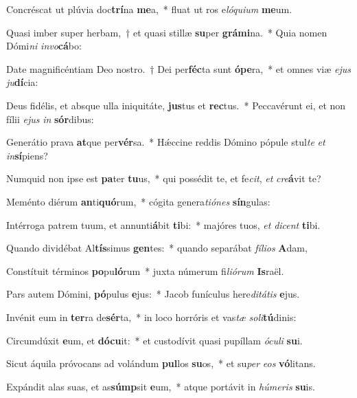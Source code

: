 \item Concréscat ut plúvia doc\textbf{trí}na \textbf{me}a,~* fluat ut ros e\textit{ló}\textit{qui}\textit{um} \textbf{me}um.
\item Quasi imber super herbam,~† et quasi stillæ \textbf{su}per \textbf{grá}\textbf{mi}na.~* Quia nomen Dómi\textit{ni} \textit{in}\textit{vo}\textbf{cá}bo:
\item Date magnificéntiam Deo nostro.~† Dei per\textbf{féc}ta sunt \textbf{ó}\textbf{pe}ra,~* et omnes viæ \textit{e}\textit{jus} \textit{ju}\textbf{dí}cia:
\item Deus fidélis, et absque ulla iniquitáte, \textbf{jus}tus et \textbf{rec}tus.~* Peccavérunt ei, et non fílii \textit{e}\textit{jus} \textit{in} \textbf{sór}dibus:
\item Generátio prava \textbf{at}que per\textbf{vér}sa.~* Hǽccine reddis Dómino pópule stul\textit{te} \textit{et} \textit{in}\textbf{sí}piens?
\item Numquid non ipse est \textbf{pa}ter \textbf{tu}us,~* qui possédit te, et fe\textit{cit}, \textit{et} \textit{cre}\textbf{á}vit te?
\item Meménto diérum \textbf{an}ti\textbf{quó}rum,~* cógita genera\textit{ti}\textit{ó}\textit{nes} \textbf{sín}gulas:
\item Intérroga patrem tuum, et annunti\textbf{á}bit \textbf{ti}bi:~* majóres tuos, \textit{et} \textit{di}\textit{cent} \textbf{ti}bi.
\item Quando dividébat Al\textbf{tís}simus \textbf{gen}tes:~* quando separábat \textit{fí}\textit{li}\textit{os} \textbf{A}dam,
\item Constítuit términos \textbf{po}pu\textbf{ló}rum~* juxta númerum fi\textit{li}\textit{ó}\textit{rum} \textbf{Is}raël.
\item Pars autem Dómini, \textbf{pó}pulus \textbf{e}jus:~* Jacob funículus here\textit{di}\textit{tá}\textit{tis} \textbf{e}jus.
\item Invénit eum in \textbf{ter}ra de\textbf{sér}ta,~* in loco horróris et vas\textit{tæ} \textit{so}\textit{li}\textbf{tú}dinis:
\item Circumdúxit \textbf{e}um, et \textbf{dó}\textbf{cu}it:~* et custodívit quasi pupíllam \textit{ó}\textit{cu}\textit{li} \textbf{su}i.
\item Sicut áquila próvocans ad volándum \textbf{pul}los \textbf{su}os,~* et su\textit{per} \textit{e}\textit{os} \textbf{vó}litans.
\item Expándit alas suas, et as\textbf{súmp}sit \textbf{e}um,~* atque portávit in \textit{hú}\textit{me}\textit{ris} \textbf{su}is.
